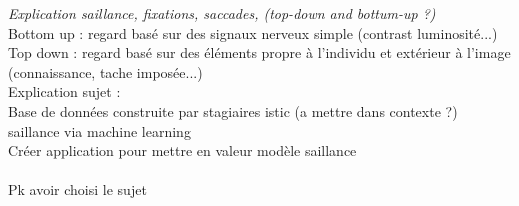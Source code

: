 \par 


\textit{Explication saillance, fixations, saccades, (top-down and bottum-up ?)}\\
Bottom up : regard basé sur des signaux nerveux simple (contrast luminosité...)
Top down : regard basé sur des éléments propre à l'individu et extérieur à l'image (connaissance, tache imposée...)
~\\
Explication sujet :\\
Base de données construite par stagiaires istic (a mettre dans contexte ?)\\
saillance via machine learning\\
Créer application pour mettre en valeur modèle saillance\\
~\\
Pk avoir choisi le sujet\\